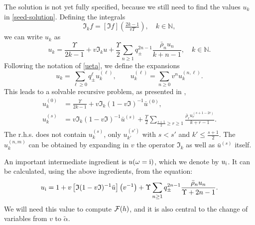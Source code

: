 \documentclass[a4paper,11pt]{article}
\theoremstyle{definition}
\newcommand{\CF}{{\cal F}}
\def\IN{{\mathbb N}}
\newcommand{\ri}{{\rm i}}
\newcommand{\ba}{\begin{aligned}}
\newcommand{\ea}{\end{aligned}}
\begin{document}
The solution is not yet fully specified, because we still need to find the values $u_k$ in \eqref{seed-solution}. 
Defining the integrals
\begin{equation}
\mathfrak{I}_{k} f = \left[\mathfrak{I} f\right]\left(\tfrac{2k-1}{v\Upsilon}\right),\quad k\in\IN,
\end{equation}
we can write $u_k$ as
\begin{equation}
u_k=\frac{\Upsilon}{2k-1}+v \mathfrak{I}_k u + \frac{\Upsilon}{2}\sum_{n\geq 1}q^{2n-1}_\pm\frac{\bar\rho_{n} u_n}{k+n-1},\quad k\in\IN.
\label{eq_uk_v2}
\end{equation}
Following the notation of \eqref{ueta}, we define the expansions
\begin{equation}
u_k = \sum_{\ell \geq 0} q_\pm^\ell  u_k^{(\ell)},\qquad
u^{(\ell)}_k = \sum_{n\geq 0} v^{n} u^{(n,\ell)}_k.
\end{equation}
This leads to a solvable recursive problem, as presented in \cite{mmr-an},
\begin{align}
u_k^{(0)}&=\frac{\Upsilon}{2k-1}+v\mathfrak{I}_k(1-v\mathfrak{I})^{-1}{\bar u^{(0)}}\label{uks-seed},\\
u_k^{(s)}&=v \mathfrak{I}_k(1-v\mathfrak{I})^{-1}{\bar u^{(s)}} + \frac{\Upsilon}{2}\sum_{\tfrac{s+1}{2}\geq r\geq 1} \frac{\bar\rho_r u_r^{(s+1-2r)}}{k+r-1}\label{uks-recurs}.
\end{align}
The r.h.s. does not contain $u^{(s)}_k$, only $u_{k'}^{(s')}$ with $s<s'$ and $k'\leq \frac{s+1}{2}$. The $u_k^{(n,m)}$ can be obtained by expanding in $v$ the operator $\mathfrak{I}_k$ as well as $\bar{u}^{(s)}$ itself.

An important intermediate ingredient is $u(\omega=\ri)$, which we denote by $u_\ri$. It can be calculated, using the above ingredients, from the equation:
\begin{equation}
u_\ri=1+v \left[\mathfrak{I} (1-v\mathfrak{I})^{-1} \bar{u}\right]\left(v^{-1}\right) + \Upsilon\sum_{n\geq 1}
q^{2n-1}_\pm
\frac{\bar\rho_{n} u_n}{\Upsilon+2n-1}.
\label{eq_ui_v2}
\end{equation}
We will need this value to compute $\CF(h)$, and it is also central to the change of variables from $v$ to $\tilde{\alpha}$.
\end{document}
